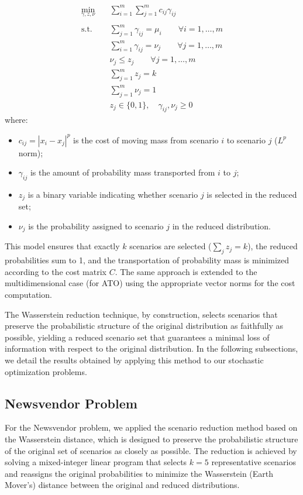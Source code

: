 \documentclass[a4paper,12pt]{article}
\begin{document}
	\[
	\begin{aligned}
		\min_{\gamma, z, \nu} \quad & \sum_{i=1}^m \sum_{j=1}^m c_{ij} \gamma_{ij} \\\\
		\text{s.t.} \quad
		& \sum_{j=1}^m \gamma_{ij} = \mu_i \qquad \forall i=1,\ldots,m \\
		& \sum_{i=1}^m \gamma_{ij} = \nu_j \qquad \forall j=1,\ldots,m \\
		& \nu_j \leq z_j \qquad \forall j=1,\ldots,m \\
		& \sum_{j=1}^m z_j = k \\
		& \sum_{j=1}^m \nu_j = 1 \\
		& z_j \in \{0,1\}, \quad \gamma_{ij}, \nu_j \geq 0
	\end{aligned}
	\]
	where:
	\begin{itemize}
		\item $c_{ij} = |x_i - x_j|^p$ is the cost of moving mass from scenario $i$ to scenario $j$ ($L^p$ norm);
		\item $\gamma_{ij}$ is the amount of probability mass transported from $i$ to $j$;
		\item $z_j$ is a binary variable indicating whether scenario $j$ is selected in the reduced set;
		\item $\nu_j$ is the probability assigned to scenario $j$ in the reduced distribution.
	\end{itemize}
	
	This model ensures that exactly $k$ scenarios are selected ($\sum_j z_j = k$), the reduced probabilities sum to 1, and the transportation of probability mass is minimized according to the cost matrix $C$. The same approach is extended to the multidimensional case (for ATO) using the appropriate vector norms for the cost computation.
	
	The Wasserstein reduction technique, by construction, selects scenarios that preserve the probabilistic structure of the original distribution as faithfully as possible, yielding a reduced scenario set that guarantees a minimal loss of information with respect to the original distribution. In the following subsections, we detail the results obtained by applying this method to our stochastic optimization problems.
	
	\subsection{Newsvendor Problem}
	
	For the Newsvendor problem, we applied the scenario reduction method based on the Wasserstein distance, which is designed to preserve the probabilistic structure of the original set of scenarios as closely as possible. The reduction is achieved by solving a mixed-integer linear program that selects $k = 5$ representative scenarios and reassigns the original probabilities to minimize the Wasserstein (Earth Mover's) distance between the original and reduced distributions.
	
\end{document}
